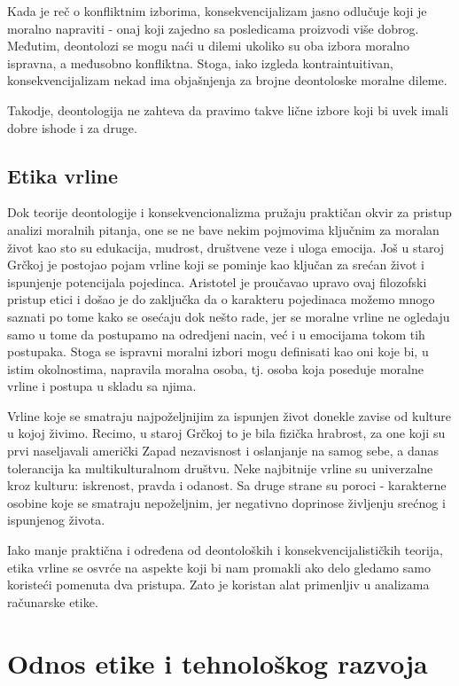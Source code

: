 \documentclass[a4paper]{article}
\begin{document}
Kada je reč o konfliktnim izborima, konsekvencijalizam jasno odlučuje koji je moralno napraviti - onaj koji zajedno sa posledicama proizvodi više dobrog. Međutim, deontolozi se mogu naći u dilemi ukoliko su oba izbora moralno ispravna, a međusobno konfliktna. Stoga, iako izgleda kontraintuitivan, konsekvencijalizam nekad ima objašnjenja za brojne deontoloske moralne dileme.

Takodje, deontologija ne zahteva da pravimo takve lične izbore koji bi uvek imali dobre ishode i za druge. 

\subsection{Etika vrline}

Dok teorije deontologije i konsekvencionalizma pružaju praktičan okvir za pristup analizi moralnih pitanja, one se ne bave nekim pojmovima ključnim za moralan život kao sto su edukacija, mudrost, društvene veze i uloga emocija. 
Još u staroj Grčkoj je postojao pojam vrline koji se pominje kao ključan za srećan život i ispunjenje potencijala pojedinca.
Aristotel je proučavao upravo ovaj filozofski pristup etici i došao je do zaključka da o karakteru pojedinaca možemo mnogo saznati po tome kako se osećaju dok nešto rade, jer se moralne vrline ne ogledaju samo u tome da postupamo na odredjeni nacin, već i u emocijama tokom tih postupaka.
Stoga se ispravni moralni izbori mogu definisati kao oni koje bi, u istim okolnostima, napravila moralna osoba, tj. osoba koja poseduje moralne vrline i postupa u skladu sa njima.

Vrline koje se smatraju najpoželjnijim za ispunjen život donekle zavise od kulture u kojoj živimo.
Recimo, u staroj Grčkoj to je bila fizička hrabrost, za one koji su prvi naseljavali američki Zapad nezavisnost i oslanjanje na samog sebe, a danas tolerancija ka multikulturalnom društvu.
Neke najbitnije vrline su univerzalne kroz kulturu: iskrenost, pravda i odanost.
Sa druge strane su poroci - karakterne osobine koje se smatraju nepoželjnim, jer negativno doprinose življenju srećnog i ispunjenog života. 

Iako manje praktična i određena od deontoloških i konsekvencijalističkih teorija, etika vrline se osvrće na aspekte koji bi nam promakli ako delo gledamo samo koristeći pomenuta dva pristupa. Zato je koristan alat primenljiv u analizama računarske etike. 

\section{Odnos etike i tehnološkog razvoja}
\end{document}
